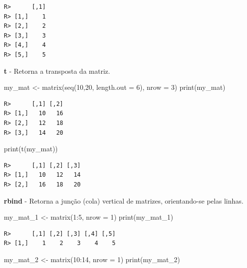 \documentclass[
  11pt,
]{book}
\newenvironment{Shaded}{\begin{snugshade}}{\end{snugshade}}
\newcommand{\AttributeTok}[1]{\textcolor[rgb]{0.61,0.61,0.61}{#1}}
\newcommand{\DecValTok}[1]{\textcolor[rgb]{0.06,0.06,0.06}{#1}}
\newcommand{\FunctionTok}[1]{\textcolor[rgb]{0,0,0}{#1}}
\newcommand{\NormalTok}[1]{#1}
\newcommand{\OtherTok}[1]{\textcolor[rgb]{0.37,0.37,0.37}{#1}}
\newcommand{\SpecialCharTok}[1]{\textcolor[rgb]{0,0,0}{#1}}
\begin{document}
\begin{verbatim}
R>      [,1]
R> [1,]    1
R> [2,]    2
R> [3,]    3
R> [4,]    4
R> [5,]    5
\end{verbatim}

\textbf{t} - Retorna a transposta da matriz.

\begin{Shaded}
\begin{Highlighting}[]
\NormalTok{my\_mat }\OtherTok{\textless{}{-}} \FunctionTok{matrix}\NormalTok{(}\FunctionTok{seq}\NormalTok{(}\DecValTok{10}\NormalTok{,}\DecValTok{20}\NormalTok{, }\AttributeTok{length.out =} \DecValTok{6}\NormalTok{), }\AttributeTok{nrow =} \DecValTok{3}\NormalTok{)}
\FunctionTok{print}\NormalTok{(my\_mat)}
\end{Highlighting}
\end{Shaded}

\begin{verbatim}
R>      [,1] [,2]
R> [1,]   10   16
R> [2,]   12   18
R> [3,]   14   20
\end{verbatim}

\begin{Shaded}
\begin{Highlighting}[]
\FunctionTok{print}\NormalTok{(}\FunctionTok{t}\NormalTok{(my\_mat))}
\end{Highlighting}
\end{Shaded}

\begin{verbatim}
R>      [,1] [,2] [,3]
R> [1,]   10   12   14
R> [2,]   16   18   20
\end{verbatim}

\textbf{rbind} - Retorna a junção (cola) vertical de matrizes, orientando-se pelas linhas.

\begin{Shaded}
\begin{Highlighting}[]
\NormalTok{my\_mat\_1 }\OtherTok{\textless{}{-}} \FunctionTok{matrix}\NormalTok{(}\DecValTok{1}\SpecialCharTok{:}\DecValTok{5}\NormalTok{, }\AttributeTok{nrow =} \DecValTok{1}\NormalTok{)}
\FunctionTok{print}\NormalTok{(my\_mat\_1)}
\end{Highlighting}
\end{Shaded}

\begin{verbatim}
R>      [,1] [,2] [,3] [,4] [,5]
R> [1,]    1    2    3    4    5
\end{verbatim}

\begin{Shaded}
\begin{Highlighting}[]
\NormalTok{my\_mat\_2 }\OtherTok{\textless{}{-}} \FunctionTok{matrix}\NormalTok{(}\DecValTok{10}\SpecialCharTok{:}\DecValTok{14}\NormalTok{, }\AttributeTok{nrow =} \DecValTok{1}\NormalTok{)}
\FunctionTok{print}\NormalTok{(my\_mat\_2)}
\end{Highlighting}
\end{Shaded}
\end{document}
